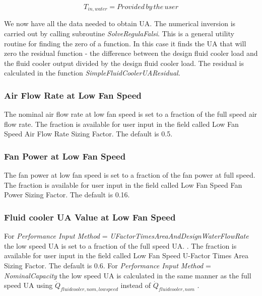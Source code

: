 \begin{equation}
{T_{in,water}} = Provided\,by\,the\,user
\end{equation}

We now have all the data needed to obtain UA. The numerical inversion is carried out by calling subroutine \emph{SolveRegulaFalsi}. This is a general utility routine for finding the zero of a function. In this case it finds the UA that will zero the residual function - the difference between the design fluid cooler load and the fluid cooler output divided by the design fluid cooler load. The residual is calculated in the function \emph{SimpleFluidCoolerUAResidual.}

\subsubsection{Air Flow Rate at Low Fan Speed}\label{air-flow-rate-at-low-fan-speed-1}

The nominal air flow rate at low fan speed is set to a fraction of the full speed air flow rate. The fraction is available for user input in the field called Low Fan Speed Air Flow Rate Sizing Factor. The default is 0.5.

\subsubsection{Fan Power at Low Fan Speed}\label{fan-power-at-low-fan-speed-1}

The fan power at low fan speed is set to a fraction of the fan power at full speed. The fraction is available for user input in the field called Low Fan Speed Fan Power Sizing Factor. The default is 0.16.

\subsubsection{Fluid cooler UA Value at Low Fan Speed}\label{fluid-cooler-ua-value-at-low-fan-speed}

For \emph{Performance Input Method} = \emph{UFactorTimesAreaAndDesignWaterFlowRate} the low speed UA is set to a fraction of the full speed UA. . The fraction is available for user input in the field called Low Fan Speed U-Factor Times Area Sizing Factor. The default is 0.6. For \emph{Performance Input Method} = \emph{NominalCapacity} the low speed UA is calculated in the same manner as the full speed UA using \({\dot Q_{fluidcooler,nom,lowspeed}}\) instead of \({\dot Q_{fluidcooler,nom}}\) .

